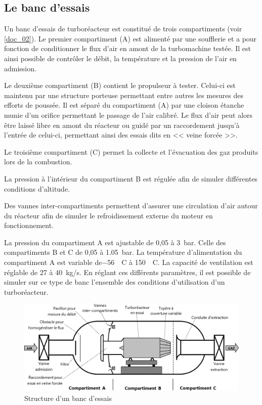 \documentclass[10pt,fleqn]{article} %
\begin{document}
\begin{multicols}{2}
\subsection{Le banc d'essais}
Un banc d'essais de turboréacteur est constitué de trois compartiments (voir \autoref{doc_02}).
	Le premier compartiment (A) est alimenté par une soufflerie et a pour fonction de conditionner le flux d'air en amont de la turbomachine testée. Il est ainsi possible de contrôler le débit, la température et la pression de l'air en admission.
	
	Le deuxième compartiment (B) contient le propulseur à tester. Celui-ci est maintenu par une structure porteuse permettant entre autres les mesures des efforts de poussée. Il est séparé du compartiment (A) par une cloison étanche munie d'un orifice permettant le passage de l'air calibré.  Le flux d'air peut alors être laissé libre en amont du réacteur ou guidé par un raccordement jusqu'à l'entrée de celui-ci, permettant ainsi des essais dits en << veine forcée >>. 
	
	Le troisième compartiment (C) permet la collecte et l'évacuation des gaz produits lors de la combustion. 
	
	La pression à l'intérieur du compartiment B est régulée afin de simuler différentes conditions d'altitude.
	
	Des vannes inter-compartiments permettent d'assurer une circulation d'air autour du réacteur afin de simuler le refroidissement externe du moteur en fonctionnement.
	
	La pression du compartiment A est ajustable de 0,05 à \SI{3}{bar}. Celle des compartiments B et C de 0,05 à \SI{1,05}{bar}. La température d'alimentation du compartiment A est variable de\SI{-56}{\degres C} à \SI{150}{\degres C}. La capacité de ventilation est réglable de 27 à \SI{40}{kg/s}. En réglant ces différents paramètres, il est possible de simuler sur ce type de banc l'ensemble des conditions d'utilisation d'un turboréacteur.

\begin{figure}[H]
\centering
\includegraphics[width=.9\linewidth]{doc_02}
\caption{\label{doc_02} Structure d'un banc d'essais}
\end{figure}



\end{multicols}
\end{document}
